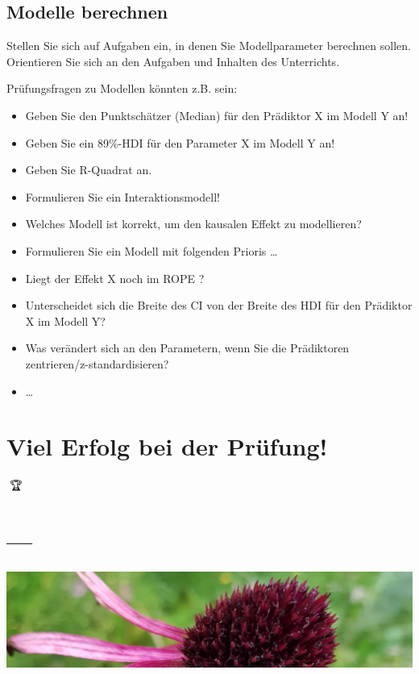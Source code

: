 \documentclass[
  a4paper,
  DIV=11]{scrreprt}
\providecommand{\tightlist}{%
  \setlength{\itemsep}{0pt}\setlength{\parskip}{0pt}}\usepackage{longtable,booktabs,array}
\theoremstyle{definition}
\theoremstyle{remark}
\begin{document}
\hypertarget{modelle-berechnen}{%
\subsection{Modelle berechnen}\label{modelle-berechnen}}

Stellen Sie sich auf Aufgaben ein, in denen Sie Modellparameter
berechnen sollen. Orientieren Sie sich an den Aufgaben und Inhalten des
Unterrichts.

Prüfungsfragen zu Modellen könnten z.B. sein:

\begin{itemize}
\tightlist
\item
  Geben Sie den Punktschätzer (Median) für den Prädiktor X im Modell Y
  an!
\item
  Geben Sie ein 89\%-HDI für den Parameter X im Modell Y an!
\item
  Geben Sie R-Quadrat an.
\item
  Formulieren Sie ein Interaktionsmodell!
\item
  Welches Modell ist korrekt, um den kausalen Effekt zu modellieren?
\item
  Formulieren Sie ein Modell mit folgenden Prioris \ldots{}
\item
  Liegt der Effekt X noch im ROPE ?
\item
  Unterscheidet sich die Breite des CI von der Breite des HDI für den
  Prädiktor X im Modell Y?
\item
  Was verändert sich an den Parametern, wenn Sie die Prädiktoren
  zentrieren/z-standardisieren?
\item
  \ldots{}
\end{itemize}

\hypertarget{viel-erfolg-bei-der-pruxfcfung}{%
\section{Viel Erfolg bei der
Prüfung!}\label{viel-erfolg-bei-der-pruxfcfung}}

🥳🏆

\hypertarget{section-11}{%
\section{---}\label{section-11}}

\includegraphics[width=1\textwidth,height=\textheight]{./img/outro-05.jpg}
\end{document}
